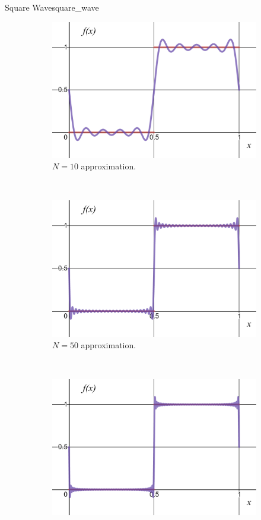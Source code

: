 \begin{ex}{Square Wave}{square_wave}
\begin{figure}[H]
			\begin{subfigure}[h]{0.3\textwidth}
				\includegraphics[width=\textwidth]{Figures_Part_5/N=10.png}
				\caption{$N=10$ approximation.}
			\end{subfigure}
			~ 
			\begin{subfigure}[h]{0.3\textwidth}
				\includegraphics[width=\textwidth]{Figures_Part_5/N=50.png}
				\caption{$N=50$ approximation.}
			\end{subfigure}
			~
			\begin{subfigure}[h]{0.3\textwidth}
				\includegraphics[width=\textwidth]{Figures_Part_5/N=100.png}

\end{subfigure}
\end{figure}
\end{ex}
